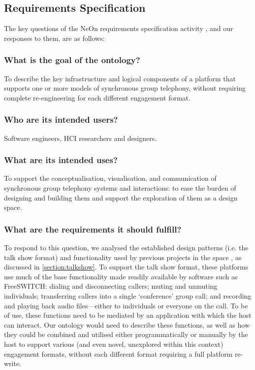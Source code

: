 \subsection{Requirements Specification}
The key questions of the NeOn requirements specification activity \cite{suarez2012_requirements}, and our responses to them, are as follows: 

\subsubsection{What is the goal of the ontology?}
To describe the key infrastructure and logical components of a platform that supports one or more models of synchronous group telephony, without requiring complete re-engineering for each different engagement format.

\subsubsection{Who are its intended users?}
Software engineers, HCI researchers and designers.

\subsubsection{What are its intended uses?} To support the conceptualisation, visualisation, and communication of synchronous group telephony systems and interactions: to ease the burden of designing and building them and support the exploration of them as a design space.


\subsubsection{What are the requirements it should fulfill?}
 
To respond to this question, we analysed the established design patterns (i.e. the talk show format) and functionality used by previous projects in the space \cite{Kazakos2016, Talhouk2017, Yadav2017}, as discussed in \ref{section:talkshow}. To support the talk show format, these platforms use much of the base functionality made readily available by software such as FreeSWITCH: dialing and disconnecting callers; muting and unmuting individuals; transferring callers into a single `conference' group call; and recording and playing back audio files---either to individuals or everyone on the call. To be of use, these functions need to be mediated by an application with which the host can interact. Our ontology would need to describe these functions, as well as how they could be combined and utilised either programmatically or manually by the host to support various (and even novel, unexplored within this context) engagement formats, without each different format requiring a full platform re-write.

